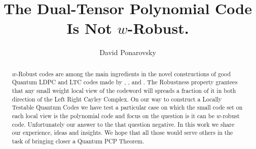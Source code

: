 \documentclass[manuscript,screen,review]{acmart}
\begin{document}
\newcommand{\commentt}[1]{\textcolor{blue}{ \textbf{[COMMENT]} #1}}
\newcommand{\ctt}[1]{\commentt{#1}}
\newcommand{\prb}[1]{ \mathbf{Pr} \left[ {#1} \right]}
\newcommand{\expp}[1]{ \mathbf{E} \left[ {#1} \right]  }
\newcommand{\onotation}[1]{\(\mathcal{O} \left( {#1}  \right) \)}
\newcommand{\ona}[1]{\onotation{#1}}
\newcommand{\Cpa}{[n, \rho n, \delta n]}
\newcommand{\Jvv}{ \bar{J_{v}} } 
\newcommand{\Cvv}{ \tilde{C_{v}} } 

\newcommand{\Gz}{ G_{z}^{\delta} } 
\newcommand{ \Tann } {  \mathcal{T}\left( G, C_0 \right) }
\newcommand{\ireducable}{ireducable \hyperref[ire]{[\ref{ire}]} }
\newcommand{\cutUU}{E(U_{-1} \bigcup U_{+1} ,U)} 
\newcommand{\wcutUU}{w\left( E(U_{-1} \bigcup U_{+1} ,U)  \right)}
\newcommand{\testgo}{  \mathcal{T}\left(J, q , C_{0}\right) } 

\newcommand{\duC}{\left( C_{A}^{\perp}\otimes C_{B}^{\perp} \right)^{\perp}}
\newcommand{\duduC}{\left( C_{A}\otimes C_{B}\right)^{\perp}}
\title{The Dual-Tensor Polynomial Code Is Not $w$-Robust. } 
\author{David Ponarovsky}

\ifdefined\ACM
{}
\else
\maketitle
\fi
%
\ifdefined\ACM
\maketitle
\fi
%
%   

\begin{abstract}$w$-Robust codes are among the main ingredients in the novel constructions of good Quantum LDPC and LTC codes made by \cite{Dinur}, \cite{leverrier2022quantum}, and \cite{Pavel}. The Robustness property grantees that any small weight local view of the codeword will spreads a fraction of it in both direction of the Left Right Cayley Complex. On our way to construct a Locally Testable Quantum Codes we have test a particular case on which the small code set on each local view is the polynomial code and focus on the question is it can be $w$-robust code. Unfortunately our answer to the that question negative. In this work we share our experience, ideas and insights. We hope that all those would serve others in the task of bringing closer a Quantum PCP Theorem.  
\end{abstract}  
\end{document}
